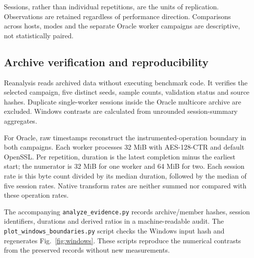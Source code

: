 Sessions, rather than individual repetitions, are the units of replication. Observations are retained regardless of performance direction. Comparisons across hosts, modes and the separate Oracle worker campaigns are descriptive, not statistically paired.

\subsection{Archive verification and reproducibility}
Reanalysis reads archived data without executing benchmark code. It verifies the selected campaign, five distinct seeds, sample counts, validation status and source hashes. Duplicate single-worker sessions inside the Oracle multicore archive are excluded. Windows contrasts are calculated from unrounded session-summary aggregates.

For Oracle, raw timestamps reconstruct the instrumented-operation boundary in both campaigns. Each worker processes 32 MiB with AES-128-CTR and default OpenSSL. Per repetition, duration is the latest completion minus the earliest start; the numerator is 32 MiB for one worker and 64 MiB for two. Each session rate is this byte count divided by its median duration, followed by the median of five session rates. Native transform rates are neither summed nor compared with these operation rates.

The accompanying \texttt{analyze\_evidence.py} records archive/member hashes, session identifiers, durations and derived ratios in a machine-readable audit. The \texttt{plot\_windows\_boundaries.py} script checks the Windows input hash and regenerates Fig.~\ref{fig:windows}. These scripts reproduce the numerical contrasts from the preserved records without new measurements.
